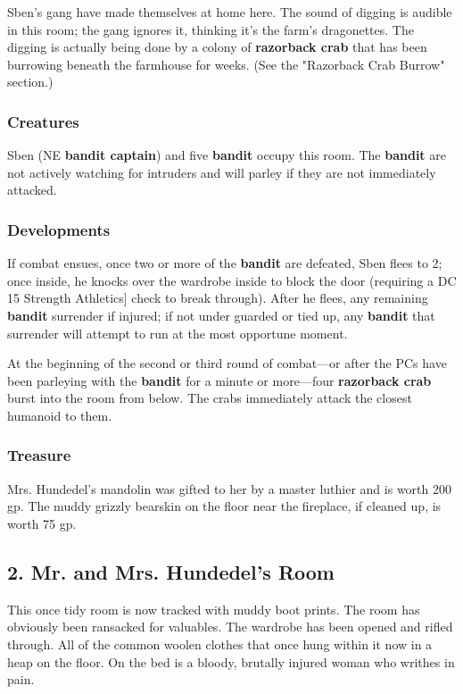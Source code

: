 \documentclass[10pt,a4paper,twoside,bg=print,twocolumn,openany,nodeprecatedcode]{dndbook}
\begin{document}
Sben's gang have made themselves at home here. The sound of digging is audible in this room; the gang ignores it, thinking it's the farm's dragonettes. The digging is actually being done by a colony of \textbf{razorback crab} that has been burrowing beneath the farmhouse for weeks. (See the "Razorback Crab Burrow" section.)

\subsubsection{Creatures}
Sben (NE \textbf{bandit captain}) and five \textbf{bandit} occupy this room. The \textbf{bandit} are not actively watching for intruders and will parley if they are not immediately attacked.

\subsubsection{Developments}
If combat ensues, once two or more of the \textbf{bandit} are defeated, Sben flees to 2; once inside, he knocks over the wardrobe inside to block the door (requiring a DC 15 Strength Athletics] check to break through). After he flees, any remaining \textbf{bandit} surrender if injured; if not under guarded or tied up, any \textbf{bandit} that surrender will attempt to run at the most opportune moment.

At the beginning of the second or third round of combat—or after the PCs have been parleying with the \textbf{bandit} for a minute or more—four \textbf{razorback crab} burst into the room from below. The crabs immediately attack the closest humanoid to them.

\subsubsection{Treasure}
Mrs. Hundedel's mandolin was gifted to her by a master luthier and is worth 200 gp. The muddy grizzly bearskin on the floor near the fireplace, if cleaned up, is worth 75 gp.

\subsection{2. Mr. and Mrs. Hundedel's Room}
\begin{DndReadAloud}{}
This once tidy room is now tracked with muddy boot prints. The room has obviously been ransacked for valuables. The wardrobe has been opened and rifled through. All of the common woolen clothes that once hung within it now in a heap on the floor. On the bed is a bloody, brutally injured woman who writhes in pain.

\end{DndReadAloud}
\end{document}
